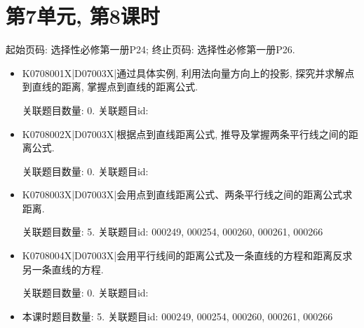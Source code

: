 \section*{第7单元, 第8课时}
起始页码: 选择性必修第一册P24; 终止页码: 选择性必修第一册P26.
\begin{itemize}
\item K0708001X|D07003X|通过具体实例, 利用法向量方向上的投影, 探究并求解点到直线的距离, 掌握点到直线的距离公式.

关联题目数量: 0. 关联题目id: 

\item K0708002X|D07003X|根据点到直线距离公式, 推导及掌握两条平行线之间的距离公式.

关联题目数量: 0. 关联题目id: 

\item K0708003X|D07003X|会用点到直线距离公式、两条平行线之间的距离公式求距离.

关联题目数量: 5. 关联题目id: 000249, 000254, 000260, 000261, 000266

\item K0708004X|D07003X|会用平行线间的距离公式及一条直线的方程和距离反求另一条直线的方程.

关联题目数量: 0. 关联题目id: 

\item 本课时题目数量: 5. 关联题目id: 000249, 000254, 000260, 000261, 000266

\end{itemize}


